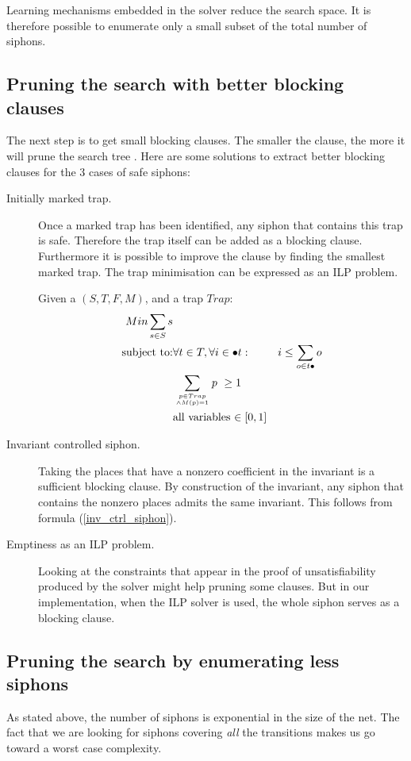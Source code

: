 \documentclass[a4paper]{report}
\numberwithin{algorithm}{chapter}
\begin{document}
Learning mechanisms embedded in the solver reduce the search space.
It is therefore possible to enumerate only a small subset of the total number of siphons.

\subsection{Pruning the search with better blocking clauses}
The next step is to get small blocking clauses.
The smaller the clause, the more it will prune the search tree \cite{decision_procedure}.
Here are some solutions to extract better blocking clauses for the 3 cases of safe siphons:

\begin{description}

\item[Initially marked trap.]
Once a marked trap has been identified, any siphon that contains this trap is safe.
Therefore the trap itself can be added as a blocking clause.
Furthermore it is possible to improve the clause by finding the smallest marked trap.
The trap minimisation can be expressed as an ILP problem.

Given a \pn{} $(S,T,F,M)$, and a trap $Trap$:
\begin{eqnarray*}
Min \sum_{s \in S} s & &\\
\text{subject to:} & \forall t \in T, \forall i \in \bullet t : &  i \le \sum_{o \in t \bullet} o\\
& \displaystyle \sum_{p \in Trap \atop {\land M(p) = 1} } p ~ \ge 1 & \\
& \text{all variables $\in [0,1]$}
\end{eqnarray*}

\item[Invariant controlled siphon.]
Taking the places that have a nonzero coefficient in the invariant is a sufficient blocking clause.
By construction of the invariant, any siphon that contains the nonzero places admits the same invariant.
This follows from formula (\ref{inv_ctrl_siphon}).

\item[Emptiness as an ILP problem.]
Looking at the constraints that appear in the proof of unsatisfiability produced by the solver might help pruning some clauses.
But in our implementation, when the ILP solver is used, the whole siphon serves as a blocking clause.

\end{description}

\subsection{Pruning the search by enumerating less siphons}
As stated above, the number of siphons is exponential in the size of the net.
The fact that we are looking for siphons covering \emph{all} the transitions makes us go toward a worst case complexity.
\end{document}
